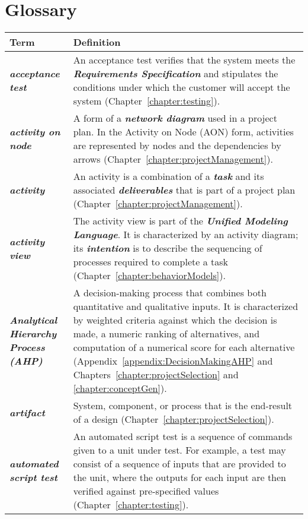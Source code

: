 \chapter{Glossary}
\label{appendix:glossary}

\begin{longtable} { p{3cm} p{11cm}} 

Term & Definition \B \\ \hline
\endhead

\emph{\textbf{acceptance test}} &
An acceptance test verifies that the system meets the  
\emph{\textbf{Requirements Specification}} and stipulates the conditions
under which the customer will accept the system (Chapter~\ref{chapter:testing}). \B  \\

\emph{\textbf{activity on node}} & A form of a \emph{\textbf{network
diagram}} used in a project plan. In the Activity on Node (AON) form,
activities are represented by nodes and the dependencies by arrows
(Chapter~\ref{chapter:projectManagement}). \B  \\

\emph{\textbf{activity}} & An activity is a combination of a
\emph{\textbf{task}} and its associated \emph{\textbf{deliverables}}
that is part of a project plan (Chapter~\ref{chapter:projectManagement}). \B  \\

\emph{\textbf{activity view}} & The activity view is part of the
\emph{\textbf{Unified Modeling Language}}. It is characterized by an
activity diagram; its \emph{\textbf{intention}} is to describe the
sequencing of processes required to complete a task (Chapter~\ref{chapter:behaviorModels}). \B  \\

\emph{\textbf{Analytical Hierarchy Process (AHP)}} & A decision-making
process that combines both quantitative and qualitative inputs. It is
characterized by weighted criteria against which the decision is made, a
numeric ranking of alternatives, and computation of a numerical score
for each alternative (Appendix~\ref{appendix:DecisionMakingAHP} and 
Chapters~\ref{chapter:projectSelection} and \ref{chapter:conceptGen}). \B \\

\emph{\textbf{artifact}} & System, component, or process that is the
end-result of a design (Chapter~\ref{chapter:projectSelection}). \B \\

\emph{\textbf{automated script test}} & An automated script test is a
sequence of commands given to a unit under test. For example, a test may
consist of a sequence of inputs that are provided to the unit, where the
outputs for each input are then verified against pre-specified values
(Chapter~\ref{chapter:testing}). \B \\


\end{longtable}

